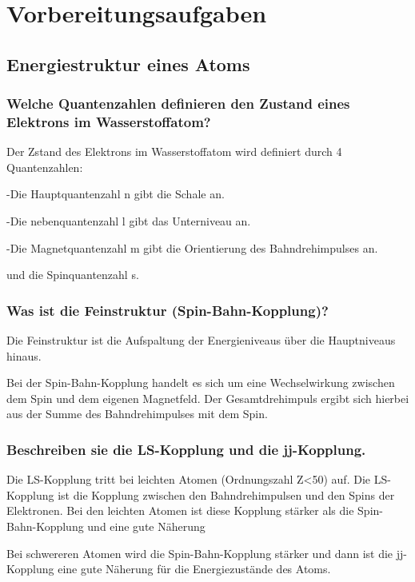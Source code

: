 \section{Vorbereitungsaufgaben}

\subsection{Energiestruktur eines Atoms}

\subsubsection{Welche Quantenzahlen definieren den Zustand eines Elektrons im Wasserstoffatom?}

Der Zstand des Elektrons im Wasserstoffatom wird definiert durch 4 Quantenzahlen:

-Die Hauptquantenzahl n gibt die Schale an.

-Die nebenquantenzahl l gibt das Unterniveau an.

-Die Magnetquantenzahl m gibt die Orientierung des Bahndrehimpulses an.

und die Spinquantenzahl s.

\subsubsection{Was ist die Feinstruktur (Spin-Bahn-Kopplung)?}

Die Feinstruktur ist die Aufspaltung der Energieniveaus über die Hauptniveaus hinaus.

Bei der Spin-Bahn-Kopplung handelt es sich um eine Wechselwirkung zwischen dem Spin und dem eigenen Magnetfeld. Der Gesamtdrehimpuls ergibt sich hierbei aus der Summe des Bahndrehimpulses mit dem Spin.

\subsubsection{Beschreiben sie die LS-Kopplung und die jj-Kopplung.}

Die LS-Kopplung tritt bei leichten Atomen (Ordnungszahl Z<50) auf. Die LS-Kopplung ist die Kopplung zwischen den Bahndrehimpulsen und den Spins der Elektronen. Bei den leichten Atomen ist diese Kopplung stärker als die Spin-Bahn-Kopplung und eine gute Näherung

Bei schwereren Atomen wird die Spin-Bahn-Kopplung stärker und dann ist die jj-Kopplung eine gute Näherung für die Energiezustände des Atoms. 

